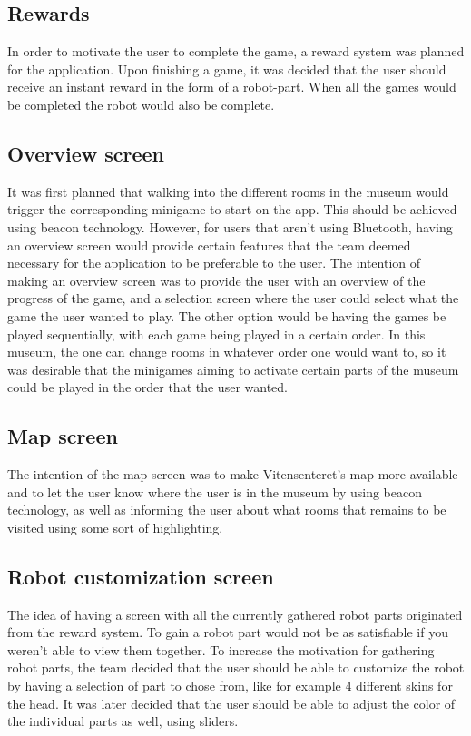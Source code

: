 \subsection{Rewards}
In order to motivate the user to complete the game,  a reward system was planned for the application. Upon finishing a game, it was decided that the user should receive an instant reward in the form of a robot-part. When all the games would be completed the robot would also be complete. 

\subsection{Overview screen}
It was first planned that walking into the different rooms in the museum would trigger the corresponding minigame to start on the app. This should be achieved using beacon technology. However, for users that aren't using Bluetooth, having an overview screen would provide certain features that the team deemed necessary for the application to be preferable to the user. The intention of making an overview screen was to provide the user with an overview of the progress of the game, and a selection screen where the user could select what the game the user wanted to play. The other option would be having the games be played sequentially, with each game being played in a certain order. In this museum, the one can change rooms in whatever order one would want to, so it was desirable that the minigames aiming to activate certain parts of the museum could be played in the order that the user wanted.

\subsection{Map screen}
The intention of the map screen was to make Vitensenteret's map more available and to let the user know where the user is in the museum by using beacon technology, as well as informing the user about what rooms that remains to be visited using some sort of highlighting. 

\subsection{Robot customization screen}
The idea of having a screen with all the currently gathered robot parts originated from the reward system. To gain a robot part would not be as satisfiable if you weren't able to view them together. To increase the motivation for gathering robot parts, the team decided that the user should be able to customize the robot by having a selection of part to chose from, like for example 4 different skins for the head. It was later decided that the user should be able to adjust the color of the individual parts as well, using sliders.

